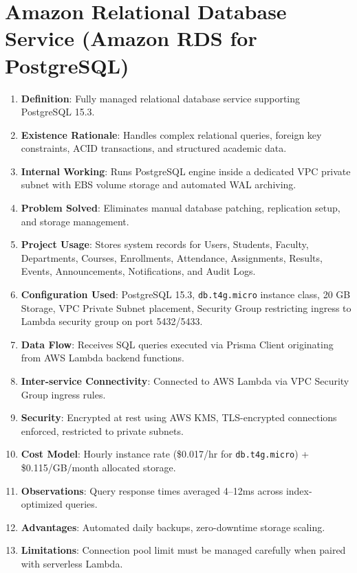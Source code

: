 \section{Amazon Relational Database Service (Amazon RDS for PostgreSQL)}
\begin{enumerate}
    \item \textbf{Definition}: Fully managed relational database service supporting PostgreSQL 15.3.
    \item \textbf{Existence Rationale}: Handles complex relational queries, foreign key constraints, ACID transactions, and structured academic data.
    \item \textbf{Internal Working}: Runs PostgreSQL engine inside a dedicated VPC private subnet with EBS volume storage and automated WAL archiving.
    \item \textbf{Problem Solved}: Eliminates manual database patching, replication setup, and storage management.
    \item \textbf{Project Usage}: Stores system records for Users, Students, Faculty, Departments, Courses, Enrollments, Attendance, Assignments, Results, Events, Announcements, Notifications, and Audit Logs.
    \item \textbf{Configuration Used}: PostgreSQL 15.3, \texttt{db.t4g.micro} instance class, 20 GB Storage, VPC Private Subnet placement, Security Group restricting ingress to Lambda security group on port 5432/5433.
    \item \textbf{Data Flow}: Receives SQL queries executed via Prisma Client originating from AWS Lambda backend functions.
    \item \textbf{Inter-service Connectivity}: Connected to AWS Lambda via VPC Security Group ingress rules.
    \item \textbf{Security}: Encrypted at rest using AWS KMS, TLS-encrypted connections enforced, restricted to private subnets.
    \item \textbf{Cost Model}: Hourly instance rate (\$0.017/hr for \texttt{db.t4g.micro}) + \$0.115/GB/month allocated storage.
    \item \textbf{Observations}: Query response times averaged 4–12ms across index-optimized queries.
    \item \textbf{Advantages}: Automated daily backups, zero-downtime storage scaling.
    \item \textbf{Limitations}: Connection pool limit must be managed carefully when paired with serverless Lambda.
\end{enumerate}

